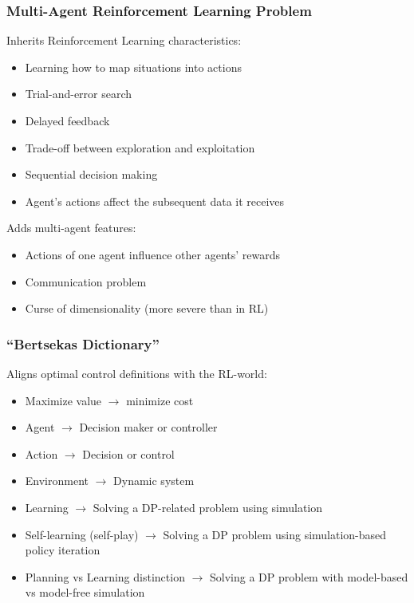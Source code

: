 \documentclass{beamer}
\begin{document}


    \begin{frame}
        \frametitle{Multi-Agent Reinforcement Learning Problem}
        Inherits Reinforcement Learning characteristics:
        \begin{itemize}
            \item Learning how to map situations into actions
            \item Trial-and-error search
            \item Delayed feedback
            \item Trade-off between exploration and exploitation
            \item Sequential decision making
            \item Agent's actions affect the subsequent data it receives
        \end{itemize}

        Adds multi-agent features:
        \begin{itemize}
            \item Actions of one agent influence other agents' rewards
            \item Communication problem
            \item Curse of dimensionality (more severe than in RL)
        \end{itemize}

    \end{frame}



\begin{frame}
	\frametitle{``Bertsekas Dictionary''}
	
	Aligns optimal control definitions with the RL-world:
	\begin{itemize}
		\item Maximize value $\rightarrow$ minimize cost		
		\item Agent $\rightarrow$ Decision maker or controller
		\item Action $\rightarrow$ Decision or control
		\item Environment  $\rightarrow$ Dynamic system
		\item Learning $\rightarrow$ Solving a DP-related problem using simulation
		\item Self-learning (self-play) $\rightarrow$ Solving a DP problem using simulation-based policy iteration
		\item Planning vs Learning distinction $\rightarrow$ Solving a DP problem with model-based vs model-free simulation	
	\end{itemize}
	
\end{frame}
\end{document}
